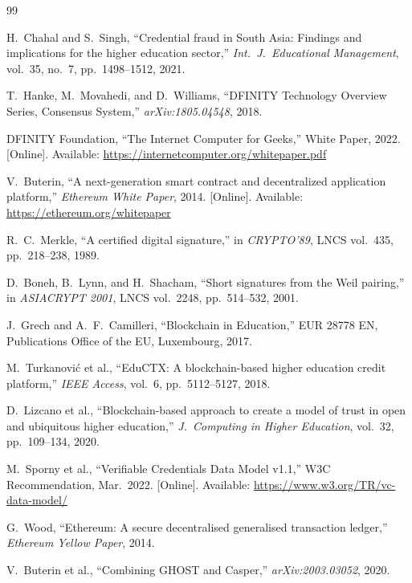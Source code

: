 \documentclass[conference,a4paper]{IEEEtran}
\begin{document}
\begin{thebibliography}{99}

H.~Chahal and S.~Singh,
``Credential fraud in South Asia: Findings and implications for the higher education sector,''
\textit{Int.\ J.\ Educational Management}, vol.~35, no.~7, pp.~1498--1512, 2021.

T.~Hanke, M.~Movahedi, and D.~Williams,
``DFINITY Technology Overview Series, Consensus System,''
\textit{arXiv:1805.04548}, 2018.

DFINITY Foundation,
``The Internet Computer for Geeks,''
White Paper, 2022.
[Online]. Available: \url{https://internetcomputer.org/whitepaper.pdf}

V.~Buterin,
``A next-generation smart contract and decentralized application platform,''
\textit{Ethereum White Paper}, 2014.
[Online]. Available: \url{https://ethereum.org/whitepaper}

R.~C.~Merkle,
``A certified digital signature,''
in \textit{CRYPTO'89}, LNCS vol.~435, pp.~218--238, 1989.

D.~Boneh, B.~Lynn, and H.~Shacham,
``Short signatures from the Weil pairing,''
in \textit{ASIACRYPT 2001}, LNCS vol.~2248, pp.~514--532, 2001.

J.~Grech and A.~F.~Camilleri,
``Blockchain in Education,''
EUR 28778 EN, Publications Office of the EU, Luxembourg, 2017.

M.~Turkanovi\'{c} et al.,
``EduCTX: A blockchain-based higher education credit platform,''
\textit{IEEE Access}, vol.~6, pp.~5112--5127, 2018.

D.~Lizcano et al.,
``Blockchain-based approach to create a model of trust in open and ubiquitous higher education,''
\textit{J.\ Computing in Higher Education}, vol.~32, pp.~109--134, 2020.

M.~Sporny et al.,
``Verifiable Credentials Data Model v1.1,''
W3C Recommendation, Mar.\ 2022.
[Online]. Available: \url{https://www.w3.org/TR/vc-data-model/}

G.~Wood,
``Ethereum: A secure decentralised generalised transaction ledger,''
\textit{Ethereum Yellow Paper}, 2014.

V.~Buterin et al.,
``Combining GHOST and Casper,''
\textit{arXiv:2003.03052}, 2020.


\end{thebibliography}
\end{document}
